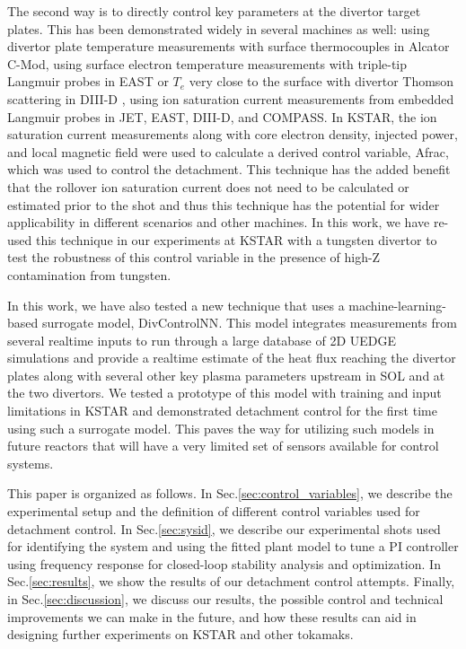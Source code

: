 The second way is to directly control key parameters at the divertor target plates.
This has been demonstrated widely in several machines as well:
using divertor plate temperature measurements with surface thermocouples in Alcator C-Mod\cite{Brunner_2017_NF},
using surface electron temperature measurements with triple-tip Langmuir probes in EAST\cite{Eldon_2021_NME} or $T_e$ very close to the surface with divertor Thomson scattering in DIII-D \cite{Eldon_2017_NF},
using ion saturation current measurements from embedded Langmuir probes in JET\cite{Guillemaut_2017_PPCF}, EAST\cite{Yuan_2020_FED}, DIII-D\cite{Eldon_2021_NME}, and COMPASS\cite{Khodunov_2021_PPCF}.
In KSTAR, the ion saturation current measurements along with core electron density, injected power, and local magnetic field were used to calculate a derived control variable, \ac{Afrac}, which was used to control the detachment\cite{Eldon_2022_PPCF}.
This technique has the added benefit that the rollover ion saturation current does not need to be calculated or estimated prior to the shot and thus this technique has the potential for wider applicability in different scenarios and other machines.
In this work, we have re-used this technique in our experiments at KSTAR with a tungsten divertor to test the robustness of this control variable in the presence of high-Z contamination from tungsten.

In this work, we have also tested a new technique that uses a machine-learning-based surrogate model, DivControlNN\cite{Zhu_2025_InPrep}.
This model integrates measurements from several realtime inputs to run through a large database of 2D UEDGE\cite{Rognlien_1999_PP} simulations and provide a realtime estimate of the heat flux reaching the divertor plates along with several other key plasma parameters upstream in \ac{SOL} and at the two divertors.
We tested a prototype of this model with training and input limitations in KSTAR and demonstrated detachment control for the first time using such a surrogate model.
This paves the way for utilizing such models in future reactors that will have a very limited set of sensors available for control systems.

This paper is organized as follows.
In Sec.\ref{sec:control_variables}, we describe the experimental setup and the definition of different control variables used for detachment control.
In Sec.\ref{sec:sysid}, we describe our experimental shots used for identifying the system and using the fitted plant model to tune a PI controller using frequency response for closed-loop stability analysis and optimization.
In Sec.\ref{sec:results}, we show the results of our detachment control attempts.
Finally, in Sec.\ref{sec:discussion}, we discuss our results, the possible control and technical improvements we can make in the future, and how these results can aid in designing further experiments on KSTAR and other tokamaks.